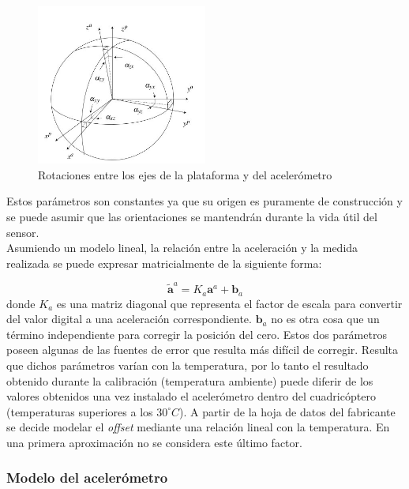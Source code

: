 \documentclass[main]{subfiles}
\begin{document}
\begin{figure}
  \vspace{-20pt}
  \begin{center}
    \includegraphics[width=0.5\textwidth]{./pics_acc/ejes_acc.jpg}
  \end{center}
  \vspace{-20pt}
  \caption{Rotaciones entre los ejes de la plataforma y del acelerómetro}
  \label{fig:ejes}
  \vspace{-10pt}
\end{figure}

Estos parámetros son constantes ya que su origen es puramente de construcción y se puede asumir que las orientaciones se mantendrán durante la vida útil del sensor.\\

Asumiendo un modelo lineal, la relación entre la aceleración y la medida realizada se puede expresar matricialmente de la siguiente forma:
 
$$\tilde{\mathbf{a}}^a = K_a \mathbf{a}^a + \mathbf{b}_a$$ donde $K_a$ es una matriz diagonal que representa el factor de escala para convertir del valor digital a una aceleración correspondiente. $\mathbf{b}_a$ no es otra cosa que un término independiente para corregir la posición del cero. Estos dos parámetros poseen algunas de las fuentes de error que resulta más difícil de corregir. Resulta que dichos parámetros varían con la temperatura, por lo tanto el resultado obtenido durante la calibraci\'on (temperatura ambiente) puede diferir de los valores obtenidos una vez instalado el aceler\'ometro dentro del cuadric\'optero (temperaturas superiores a los $30^\circ C$). A partir de la hoja de datos del fabricante se decide modelar el \emph{offset} mediante una relaci\'on lineal con la temperatura. En una primera aproximaci\'on no se considera este \'ultimo factor.

\subsubsection{Modelo del acelerómetro}
\end{document}
